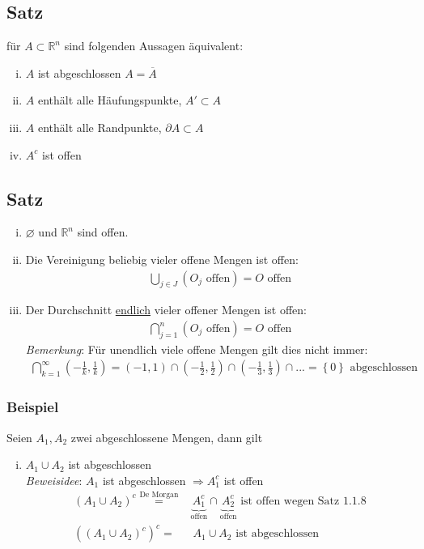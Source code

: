 \documentclass[11pt,a4paper]{book}
\newcommand {\Rn}	{\mathbb{R}^n}
\newcommand{\1}    	{\mathbbm{1}}
\begin{document}
\subsection{Satz}
für \(A \subset \Rn\) sind folgenden Aussagen äquivalent:
\begin{enumerate}[(i)]
	\item \(A\) ist abgeschlossen \(A = \overline{A}\)
	\item \(A\) enthält alle Häufungspunkte, \(A' \subset A\)
	\item \(A\) enthält alle Randpunkte, \(\partial A \subset A\)
	\item \(A^c\) ist offen
\end{enumerate}

\subsection{Satz}
\begin{enumerate}[(i)]
	\item \(\varnothing\) und \(\Rn\) sind offen.
	\item Die Vereinigung beliebig vieler offene Mengen ist offen:
	\begin{align*}
		\bigcup_{j \in J} \left( O_j \textrm{ offen} \right) = O \textrm{ offen}
	\end{align*}
	\item Der Durchschnitt \underline{endlich} vieler offener Mengen ist offen:
	\begin{align*}
		\bigcap_{j = 1}^{n} \left( O_j \textrm{ offen} \right) = O \textrm{ offen}
	\end{align*}
	\textit{Bemerkung}: Für unendlich viele offene Mengen gilt dies nicht immer:
	\begin{align*}
		\bigcap_{k = 1}^{\infty} \left( -\frac{1}{k}, \frac{1}{k} \right) = \left( -1, 1 \right) \cap \left( -\frac{1}{2}, \frac{1}{2} \right) \cap \left( -\frac{1}{3}, \frac{1}{3} \right) \cap ... = \left\{ 0 \right\} \textrm{ abgeschlossen}
	\end{align*}
\end{enumerate}

\subsubsection{Beispiel}
Seien \(A_1, A_2\) zwei abgeschlossene Mengen, dann gilt
\begin{enumerate}[(i)]
	\item \(A_1 \cup A_2\) ist abgeschlossen \\
	\textit{Beweisidee}: \(A_1\) ist abgeschlossen \(\Rightarrow A_1^c\) ist offen \\
	\begin{align*}
		\left( A_1 \cup A_2 \right)^c \stackrel{\textrm{De Morgan}}{=}& \underbrace{A_1^c}_{\textrm{offen}} \cap \underbrace{A_2^c}_{\textrm{offen}} \textrm{ ist offen wegen Satz 1.1.8} \\
		\left( \left( A_1 \cup A_2 \right)^c \right)^c =& ~A_1 \cup A_2 \textrm{ ist abgeschlossen}
	\end{align*}
\end{enumerate}
\end{document}
